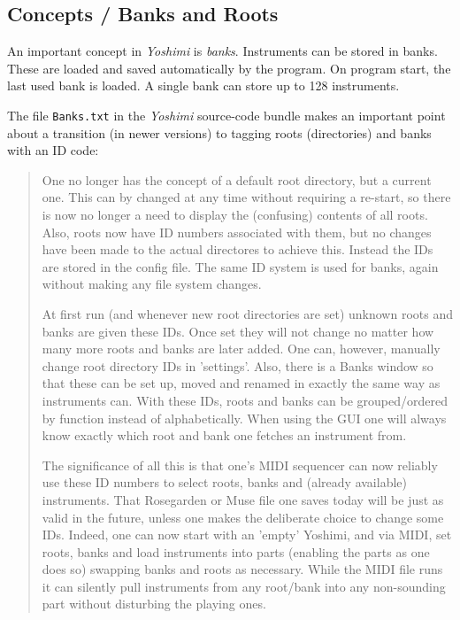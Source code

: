 \subsection{Concepts / Banks and Roots}
\label{subsec:concepts_banks_and_roots}

   An important concept in \textsl{Yoshimi} is \textsl{banks}.  Instruments
   can be stored in banks. These are loaded and saved automatically by the
   program.  On program start, the last used bank is loaded. A single bank
   can store up to 128 instruments. 

   The file \texttt{Banks.txt} in the \textsl{Yoshimi} source-code bundle
   makes an important point about a transition (in newer versions)
   to tagging roots (directories) and banks with an ID code:

   \begin{quotation}
      One no longer has the concept of a default root directory, but a
      current one. This can by changed at any time without requiring a
      re-start, so there is now no longer a need to display the (confusing)
      contents of all roots.  Also, roots now have ID numbers associated
      with them, but no changes have been made to the actual directores to
      achieve this. Instead the IDs are stored in the config file. The same
      ID system is used for banks, again without making any file system
      changes.

      At first run (and whenever new root directories are set) unknown roots
      and banks are given these IDs. Once set they will not change no matter
      how many more roots and banks are later added. One can, however,
      manually change root directory IDs in 'settings'. Also, there is a
      Banks window so that these can be set up, moved and renamed in exactly
      the same way as instruments can.  With these IDs, roots and banks can
      be grouped/ordered by function instead of alphabetically. When using
      the GUI one will always know exactly which root and bank one fetches
      an instrument from.

      The significance of all this is that one's MIDI sequencer can now
      reliably use these ID numbers to select roots, banks and (already
      available) instruments. That Rosegarden or Muse file one saves
      today will be just as valid in the future, unless one makes the
      deliberate choice to change some IDs. Indeed, one can now start with
      an 'empty' Yoshimi, and via MIDI, set roots, banks and load
      instruments into parts (enabling the parts as one does so) swapping
      banks and roots as necessary. While the MIDI file runs it can silently
      pull instruments from any root/bank into any non-sounding part without
      disturbing the playing ones.


\end{quotation}
